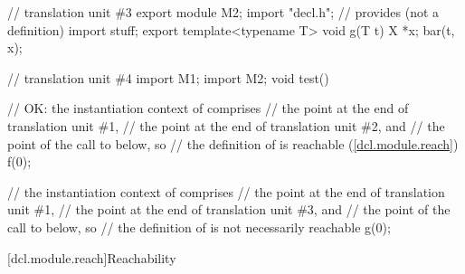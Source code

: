 \begin{std.txt}
\begin{example}
\begin{codeblock}
// translation unit \#3
export module M2;
import "decl.h";        // provides  (not a definition)
import stuff;
export template<typename T> void g(T t) {
 X *x;
 bar(t, x);
}

// translation unit \#4
import M1;
import M2;
void test() {
  // OK: the instantiation context of  comprises
  // the point at the end of translation unit \#1,
  // the point at the end of translation unit \#2, and
  // the point of the call to  below, so
  // the definition of  is reachable (\ref{dcl.module.reach})
  f(0);

  // the instantiation context of  comprises
  // the point at the end of translation unit \#1,
  // the point at the end of translation unit \#3, and
  // the point of the call to  below, so
  // the definition of  is not necessarily reachable
  g(0);
}
\end{codeblock}
\end{example}
\end{std.txt}

[dcl.module.reach]{Reachability}

